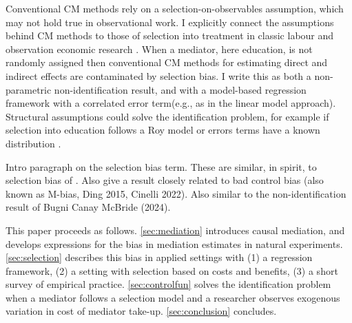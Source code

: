 Conventional CM methods rely on a selection-on-observables assumption, which may not hold true in observational work.
I explicitly connect the assumptions behind CM methods to those of selection into treatment in classic labour and observation economic research \citep{heckman2005structural}.
When a mediator, here education, is not randomly assigned then conventional CM methods for estimating direct and indirect effects are contaminated by selection bias.
I write this as both a non-parametric non-identification result, and with a model-based regression framework with a correlated error term(e.g., as in the \citealt{imai2010identification} linear model approach).
Structural assumptions could solve the identification problem, for example if selection into education follows a Roy model or errors terms have a known distribution \citep{heckman1979sample}.


Intro paragraph on the selection bias term.
These are similar, in spirit, to selection bias of \cite{heckman1998characterizing}.
Also give a result closely related to bad control bias (also known as M-bias, Ding 2015, Cinelli 2022).
Also similar to the non-identification result of Bugni Canay McBride (2024).





This paper proceeds as follows.
\autoref{sec:mediation} introduces causal mediation, and develops expressions for the bias in mediation estimates in natural experiments.
\autoref{sec:selection} describes this bias in applied settings with (1) a regression framework, (2) a setting with selection based on costs and benefits, (3) a short survey of empirical practice.
\autoref{sec:controlfun} solves the identification problem when a mediator follows a selection model and a researcher observes exogenous variation in cost of mediator take-up.
\autoref{sec:conclusion} concludes.
